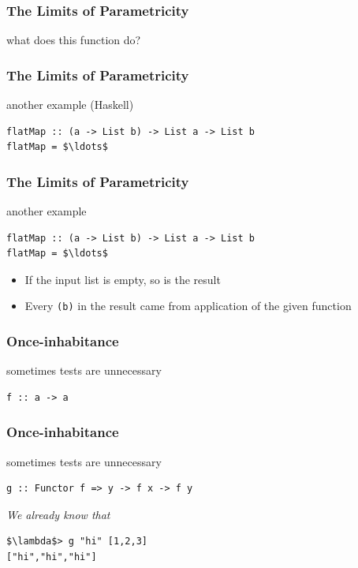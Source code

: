 \begin{frame}[fragile]
\frametitle{The Limits of Parametricity}
\begin{block}{what does this function do?}

\end{block}
\end{frame}

\begin{frame}[fragile]
\frametitle{The Limits of Parametricity}
\begin{block}{another example (Haskell)}
\begin{lstlisting}[style=haskell,mathescape]
flatMap :: (a -> List b) -> List a -> List b
flatMap = $\ldots$
\end{lstlisting}
\end{block}
\end{frame}

\begin{frame}[fragile]
\frametitle{The Limits of Parametricity}
\begin{block}{another example}
\begin{lstlisting}[style=haskell, mathescape]
flatMap :: (a -> List b) -> List a -> List b
flatMap = $\ldots$
\end{lstlisting}
\end{block}
\begin{itemize}
  \item If the input list is empty, so is the result
  \item Every \lstinline{(b)} in the result came from application of the given function
\end{itemize}
\end{frame}

\begin{frame}[fragile]
\frametitle{Once-inhabitance}
\begin{block}{sometimes tests are unnecessary}
\begin{lstlisting}
f :: a -> a
\end{lstlisting}
\end{block}
\end{frame}

\begin{frame}[fragile]
\frametitle{Once-inhabitance}
\begin{block}{sometimes tests are unnecessary}
\begin{lstlisting}
g :: Functor f => y -> f x -> f y
\end{lstlisting}
\end{block}
\emph{We already know that}
\begin{lstlisting}[style=haskell,mathescape]
$\lambda$> g "hi" [1,2,3]
["hi","hi","hi"]
\end{lstlisting}
\end{frame}

